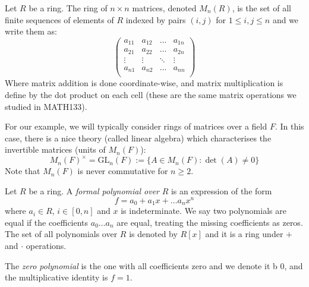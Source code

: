 \begin{example}
    Let $R$ be a ring. The ring of $n \times n$ matrices, denoted $M_n(R)$, is the set of all finite sequences of elements of $R$ indexed by pairs $(i,j)$ for $1 \leq i, j \leq n$ and we write them as:
    \[ \begin{pmatrix}
        a_{11} & a_{12} & \dots & a_{1n}\\
        a_{21} & a_{22} & \dots & a_{2n}\\
        \vdots & \vdots & \ddots & \vdots \\
        a_{n1} & a_{n2} & \dots & a_{nn}\\
    \end{pmatrix} \] 
    Where matrix addition is done coordinate-wise, and matrix multiplication is define by the dot product on each cell (these are the same matrix operations we studied in MATH133). 

    For our example, we will typically consider rings of matrices over a field $F$. In this case, there is a nice theory (called linear algebra) which characterises the invertible matrices (units of $M_n(F)$):
    \[ M_n(F)^\times = \text{GL}_n(F) := \{ A \in M_n(F) : \det(A) \neq 0\} \]
    Note that $M_n(F)$ is never commutative for $n \geq 2$. 
\end{example}

\begin{example}
    Let $R$ be a ring. A \textit{formal polynomial over} $R$ is an expression of the form 
    \[ f = a_0 + a_1x + \dots a_nx^n \]
    where $a_i \in R$, $i \in [0, n]$ and $x$ is indeterminate. We say two polynomials are equal if the coefficients $a_0 \dots a_n$ are equal, treating the missing coefficients as zeros. The set of all polynomials over $R$ is denoted by $R[x]$ and it is a ring under $+$ and $\cdot$ operations. 

    The \textit{zero polynomial} is the one with all coefficients zero and we denote it b $0$, and the multiplicative identity is $f = 1$. 
\end{example}
